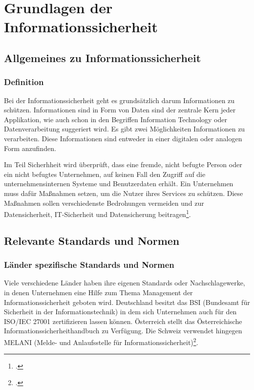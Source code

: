 \chapter{Grundlagen der Informationssicherheit}
\strahlhofer

\section{Allgemeines zu Informationssicherheit} 
\subsection{Definition}
Bei der Informationssicherheit geht es grundsätzlich darum Informationen zu schützen. Informationen sind in Form von Daten sind der zentrale Kern jeder Applikation, wie auch schon in den Begriffen Information Technology oder Datenverarbeitung suggeriert wird. Es gibt zwei Möglichkeiten Informationen zu verarbeiten. Diese Informationen sind entweder in einer digitalen oder analogen Form anzufinden.

Im Teil Sicherhheit wird überprüft, dass eine fremde, nicht befugte Person oder ein nicht befugtes Unternehmen, auf keinen Fall den Zugriff auf die unternehmensinternen Systeme und Benutzerdaten erhält. Ein Unternehmen muss dafür Maßnahmen setzen, um die Nutzer ihres Services zu schützen. Diese Maßnahmen sollen verschiedenste Bedrohungen vermeiden und zur Datensicherheit, IT-Sicherheit und Datensicherung beitragen\footcite{Lehrunterlagen-HTL-cloud}.

\section{Relevante Standards und Normen}
\subsection{Länder spezifische Standards und Normen}
Viele verschiedene Länder haben ihre eigenen Standards oder Nachschlagewerke, in denen Unternehmen eine Hilfe zum Thema Management der Informationssicherheit geboten wird.
Deutschland besitzt das BSI (Bundesamt für Sicherheit in der Informationstechnik) in dem sich Unternehmen auch für den ISO/IEC 27001 zertifizieren lassen können. Österreich stellt das Österreichische Informationssicherheithandbuch zu Verfügung. Die Schweiz verwendet hingegen MELANI (Melde- und Anlaufsstelle für Informationssicherheit)\footcite{Lehrunterlagen-HTL-cloud}.


